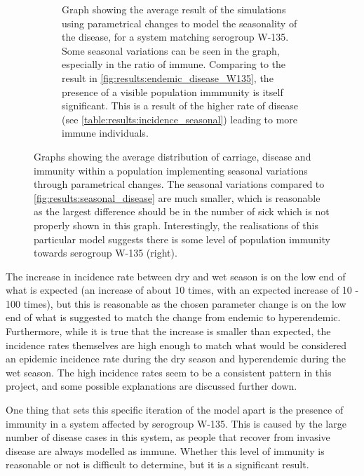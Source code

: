 \documentclass[10pt,a4paper]{article}
\begin{document}
\begin{figure}
\begin{subfigure}{0.45\textwidth}
		\caption{Graph showing the average result of the simulations using parametrical changes to model the seasonality of the disease, for a system matching serogroup W-135. Some seasonal variations can be seen in the graph, especially in the ratio of immune. Comparing to the result in \cref{fig:results:endemic_disease_W135}, the presence of a visible population immmunity is itself significant. This is a result of the higher rate of disease (see \cref{table:results:incidence_seasonal}) leading to more immune individuals.} \label{fig:results:seasonal_aves_W135_parameters}
	\end{subfigure}
	\caption{Graphs showing the average distribution of carriage, disease and immunity within a population implementing seasonal variations through parametrical changes. The seasonal variations compared to \cref{fig:results:seasonal_disease} are much smaller, which is reasonable as the largest difference should be in the number of sick which is not properly shown in this graph. Interestingly, the realisations of this particular model suggests there is some level of population immunity towards serogroup W-135 (right).} \label{fig:results:seasonal_disease_parameters}
\end{figure}

The increase in incidence rate between dry and wet season is on the low end of what is expected (an increase of about 10 times, with an expected increase of 10 - 100 times), but this is reasonable as the chosen parameter change is on the low end of what is suggested to match the change from endemic to hyperendemic. Furthermore, while it is true that the increase is smaller than expected, the incidence rates themselves are high enough to match what would be considered an epidemic incidence rate during the dry season and hyperendemic during the wet season. The high incidence rates seem to be a consistent pattern in this project, and some possible explanations are discussed further down.

One thing that sets this specific iteration of the model apart is the presence of immunity in a system affected by serogroup W-135. This is caused by the large number of disease cases in this system, as people that recover from invasive disease are always modelled as immune. Whether this level of immunity is reasonable or not is difficult to determine, but it is a significant result.


\end{document}
